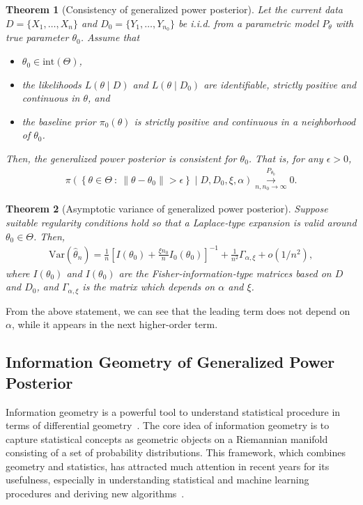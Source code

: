 \documentclass[12pt]{article}
\newtheorem{theorem}{Theorem}
\begin{document}
\begin{theorem}[Consistency of generalized power posterior]
    \label{thm:consistency}
    Let the current data $D = \{X_1,\dots,X_n\}$ and $D_0 = \{Y_1,\dots,Y_{n_0}\}$ be i.i.d. from a parametric model $P_\theta$ with true parameter $\theta_0$.
    Assume that
    \begin{itemize}
        \item $\theta_0 \in \mathrm{int}(\Theta)$,
        \item the likelihoods $L(\theta \mid D)$ and $L(\theta \mid D_0)$ are identifiable, strictly positive and continuous in $\theta$, and
        \item the baseline prior $\pi_0(\theta)$ is strictly positive and continuous in a neighborhood of $\theta_0$.
    \end{itemize}
    Then, the generalized power posterior is consistent for $\theta_0$.
    That is, for any $\epsilon > 0$,
    \begin{align*}
        \pi\left(\left\{\theta \in \Theta\ \colon\ \|\theta - \theta_0\| > \epsilon \right\} \mid D, D_0, \xi, \alpha\right) \overset{P_{\theta_0}}{\underset{n,n_0 \to \infty}{\to}} 0.
    \end{align*}
\end{theorem}
\begin{theorem}[Asymptotic variance of generalized power posterior]
    \label{thm:asymptotic_variance}
    Suppose suitable regularity conditions hold so that a Laplace‐type expansion is valid around $\theta_0 \in \Theta$.
    Then,
    \begin{align*}
        \mathrm{Var}(\hat{\theta}_n) = \frac{1}{n}\left[I(\theta_0) + \frac{\xi n_0}{n}I_0(\theta_0)\right]^{-1} + \frac{1}{n^2}\Gamma_{\alpha,\xi} + o(1/n^2),
    \end{align*}
    where $I(\theta_0)$ and $I(\theta_0)$ are the Fisher‐information‐type matrices based on $D$ and $D_0$, and $\Gamma_{\alpha,\xi}$ is the matrix which depends on $\alpha$ and $\xi$.
\end{theorem}
From the above statement, we can see that the leading term does not depend on $\alpha$, while it appears in the next higher-order term.

\subsection{Information Geometry of Generalized Power Posterior}
Information geometry is a powerful tool to understand statistical procedure in terms of differential geometry~\citep{amari2000methods,amari2016information,ay2017information,nielsen2020elementary}.
The core idea of information geometry is to capture statistical concepts as geometric objects on a Riemannian manifold consisting of a set of probability distributions.
This framework, which combines geometry and statistics, has attracted much attention in recent years for its usefulness, especially in understanding statistical and machine learning procedures and deriving new algorithms~\citep{amari1995information,amari1998natural,ay2015information,hino2024geometry,kimura2021generalized,kimura2021alpha,kimura2022information,kimura2024short,kimura2024density,martens2020new,muller2023achieving,murata2004information}.
\end{document}
